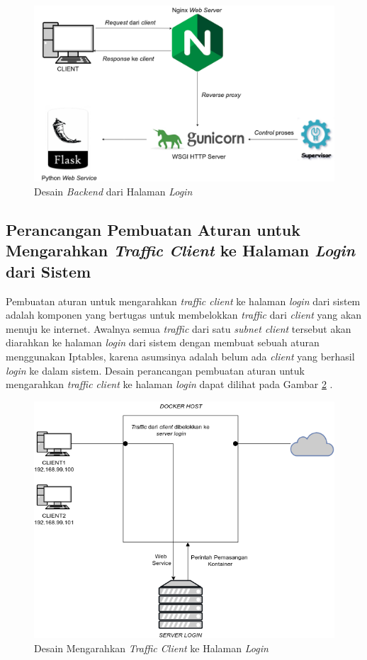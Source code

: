 \begin{figure}[H]
	\centering
	\includegraphics[width=\linewidth]{images/bab3/DesainBackend}
	\caption{Desain \textit{Backend} dari Halaman \textit{Login}}
	\label{desainbackendhalamanlogin}
\end{figure}

\subsection{Perancangan Pembuatan Aturan untuk Mengarahkan \textit{Traffic Client} ke Halaman \textit{Login} dari Sistem}
Pembuatan aturan untuk mengarahkan \textit{traffic client} ke halaman \textit{login} dari sistem adalah komponen yang bertugas untuk membelokkan \textit{traffic} dari \textit{client} yang akan menuju ke internet. Awalnya semua \textit{traffic} dari satu \textit{subnet client} tersebut akan diarahkan ke halaman \textit{login} dari sistem dengan membuat sebuah aturan menggunakan Iptables, karena asumsinya adalah belum ada \textit{client} yang berhasil \textit{login} ke dalam sistem. Desain perancangan pembuatan aturan untuk mengarahkan \textit{traffic client} ke halaman \textit{login} dapat dilihat pada Gambar \ref{dessainmengarahkankehalamanlogin} .
\begin{figure}[H]
	\centering
	\includegraphics[width=\linewidth]{images/bab3/DIAGRAM2}
	\caption{Desain Mengarahkan \textit{Traffic Client} ke Halaman \textit{Login}}
	\label{dessainmengarahkankehalamanlogin}
\end{figure}

